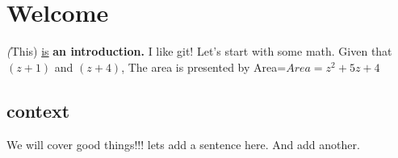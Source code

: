 \documentclass[11pt]{article}
\begin{document}
\section {Welcome}
\textit(This) \underline{is} \textbf{an introduction.} I like git!
Let's start with some math. Given that \((z+1)\) and \((z+4)\),
The area is presented by Area=\(Area=z^2+5z+4\)
\subsection[10]{context} We will cover good things!!!
lets add a sentence here.  And add another.
\end{document}
